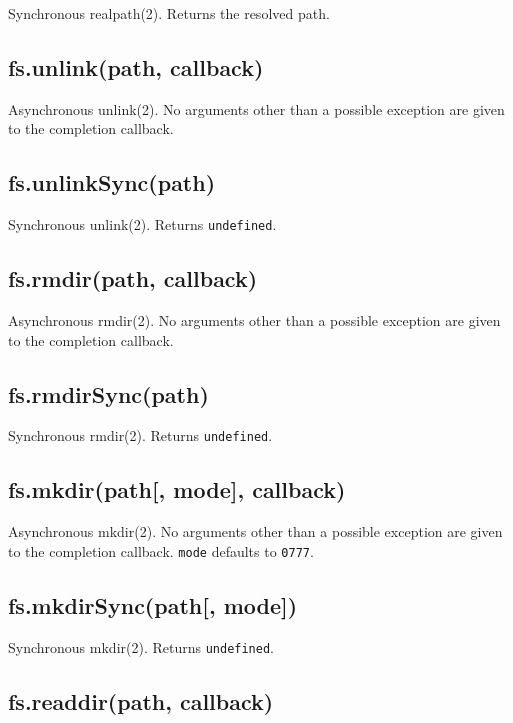 Synchronous realpath(2). Returns the resolved path.

\subsection{fs.unlink(path, callback)}\label{fs.unlinkpath-callback}

Asynchronous unlink(2). No arguments other than a possible exception are
given to the completion callback.

\subsection{fs.unlinkSync(path)}\label{fs.unlinksyncpath}

Synchronous unlink(2). Returns \texttt{undefined}.

\subsection{fs.rmdir(path, callback)}\label{fs.rmdirpath-callback}

Asynchronous rmdir(2). No arguments other than a possible exception are
given to the completion callback.

\subsection{fs.rmdirSync(path)}\label{fs.rmdirsyncpath}

Synchronous rmdir(2). Returns \texttt{undefined}.

\subsection{fs.mkdir(path{[}, mode{]},
callback)}\label{fs.mkdirpath-mode-callback}

Asynchronous mkdir(2). No arguments other than a possible exception are
given to the completion callback. \texttt{mode} defaults to
\texttt{0777}.

\subsection{fs.mkdirSync(path{[}, mode{]})}\label{fs.mkdirsyncpath-mode}

Synchronous mkdir(2). Returns \texttt{undefined}.

\subsection{fs.readdir(path, callback)}\label{fs.readdirpath-callback}

